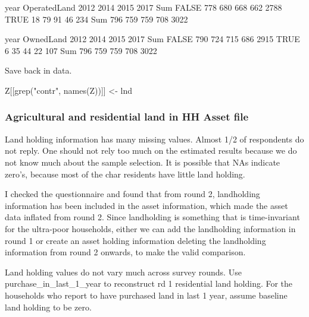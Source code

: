 \begin{Schunk}
\begin{Soutput}
            year
OperatedLand 2012 2014 2015 2017  Sum
       FALSE  778  680  668  662 2788
       TRUE    18   79   91   46  234
       Sum    796  759  759  708 3022
\end{Soutput}
\begin{Soutput}
         year
OwnedLand 2012 2014 2015 2017  Sum
    FALSE  790  724  715  686 2915
    TRUE     6   35   44   22  107
    Sum    796  759  759  708 3022
\end{Soutput}
\end{Schunk}
Save back in data.
\begin{Schunk}
\begin{Sinput}
Z[[grep("contr", names(Z))]] <- lnd
\end{Sinput}
\end{Schunk}

\subsubsection{Agricultural and residential land in HH Asset file}


\begin{description}
\vspace{1.0ex}\setlength{\itemsep}{1.0ex}\setlength{\baselineskip}{12pt}
\item[May 22, 2020]	Land holding information has many missing values. Almost 1/2 of respondents do not reply. One should not rely too much on the estimated results because we do not know much about the sample selection. It is possible that NAs indicate zero's, because most of the char residents have little land holding.
\item[Abu-san's email on Jan 30, 2020]	I checked the questionnaire and found that from round 2, landholding information has been included in the asset information, which made the asset data inflated from round 2. Since landholding is something that is time-invariant for the ultra-poor households, either we can add the landholding information in round 1 or create an asset holding information deleting the landholding information from round 2 onwards, to make the valid comparison. 
\end{description}

Land holding values do not vary much across survey rounds. %
Use \textsf{purchase\_in\_last\_1\_year} to reconstruct rd 1 residential land holding. For the households who report to have purchased land in last 1 year, assume baseline land holding to be zero.


